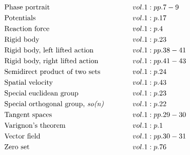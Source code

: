 \documentclass[a4paper]{article}
\begin{document}
\begin{align*}
&\text{Phase portrait} \hspace*{3em}&& vol. 1: pp. 7-9\\
&\text{Potentials} \hspace*{3em}&& vol. 1: p. 17\\
&\text{Reaction force} \hspace*{3em}&& vol. 1: p. 4\\
&\text{Rigid body} \hspace*{3em}&& vol. 1: p. 23\\
&\text{Rigid body, left lifted action} \hspace*{3em}&& vol. 1: pp. 38-41\\
&\text{Rigid body, right lifted action} \hspace*{3em}&& vol. 1: pp. 41-43\\
&\text{Semidirect product of two sets} \hspace*{3em}&& vol. 1: p. 24\\
&\text{Spatial velocity} \hspace*{3em}&& vol. 1: p. 43\\
&\text{Special euclidean group} \hspace*{3em}&& vol. 1: p. 23\\
&\text{Special orthogonal group, \emph{so(n)}} \hspace*{3em}&& vol. 1: p. 22\\
&\text{Tangent spaces} \hspace*{3em}&& vol. 1: pp. 29-30\\
&\text{Varignon's theorem} \hspace*{3em}&& vol. 1: p. 1\\
&\text{Vector field} \hspace*{3em}&& vol. 1: pp. 30-31\\
&\text{Zero set} \hspace*{3em}&& vol. 1: p. 76\\
\end{align*} 
\end{document}
